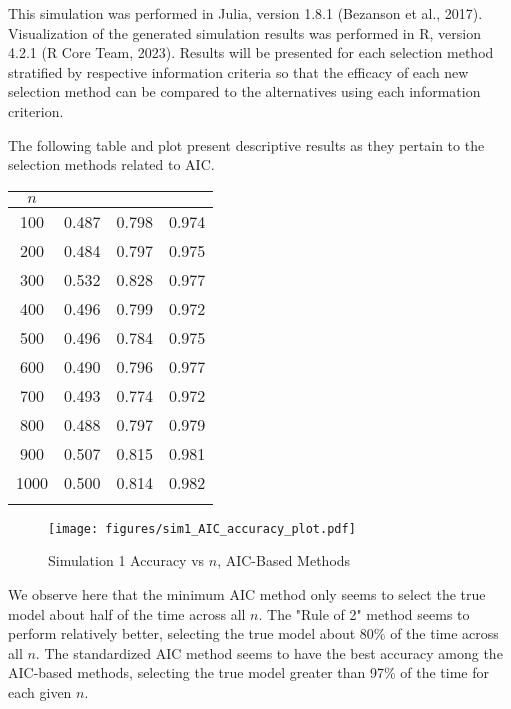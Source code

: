 		This simulation was performed in Julia, version 1.8.1 (Bezanson et al., 2017). Visualization of the generated simulation results was performed in R, version 4.2.1 (R Core Team, 2023).
		Results will be presented for each selection method stratified by respective information criteria so that the efficacy of each new selection method can be compared to the
		alternatives using each information criterion.

		The following table and plot present descriptive results as they pertain to the selection methods related to AIC.
		\begin{table}[H]
			\centering
			\small\addtolength{\tabcolsep}{-3pt}
			\setlength\extrarowheight{-3pt}
			{
			\begin{tabular}{ c|c|c|c}
			$n$ & \vtop{\hbox{\strut Minimum AIC}\hbox{\strut Accuracy}} & \vtop{\hbox{\strut AIC Rule of 2}\hbox{\strut Accuracy}} & \vtop{\hbox{\strut Standardized AIC} \hbox{\strut Accuracy}} \\
			 \hline
			 100 & 0.487 & 0.798 & 0.974 \\
			 200 & 0.484 & 0.797 & 0.975 \\
			 300 & 0.532 & 0.828 & 0.977 \\
			 400 & 0.496 & 0.799 & 0.972 \\
			 500 & 0.496 & 0.784 & 0.975 \\
			 600 & 0.490 & 0.796 & 0.977 \\
			 700 & 0.493 & 0.774 & 0.972 \\
			 800 & 0.488 & 0.797 & 0.979 \\
			 900 & 0.507 & 0.815 & 0.981 \\
			 1000 & 0.500 & 0.814 & 0.982 \\
			 \Xhline{3\arrayrulewidth}
			\end{tabular}
			}
		\end{table}

		\begin{figure}[H]
			\centering
			\captionsetup{justification=centering}
			\texttt{[image: figures/sim1\_AIC\_accuracy\_plot.pdf]}
			\caption{\label{fig:sim1_aic_accuracy_plot} Simulation 1 Accuracy vs $n$, AIC-Based Methods}
		\end{figure}

		We observe here that the minimum AIC method only seems to select the true model about half of the time across all $n$. The "Rule of 2" method seems to perform relatively better,
		selecting the true model about 80\% of the time across all $n$. The standardized AIC method seems to have the best accuracy among the AIC-based methods, selecting the true model
		greater than 97\% of the time for each given $n$.

